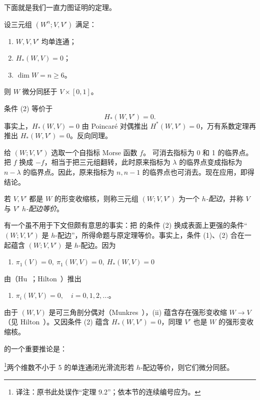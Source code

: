 
下面就是我们一直力图证明的定理。

设三元组 $(W^n;V,V')$ 满足：
\begin{enumerate}[label=(\arabic*)]
  \item $W,V,V'$ 均单连通；
  \item $H_*(W,V)=0$；
  \item $\dim W=n\geq6$。
\end{enumerate}
则 $W$ 微分同胚于 $V\times[0,1]$。

\Remark 条件 (2) 等价于
\[
  H_*(W,V')=0.
\]
事实上，$H_*(W,V)=0$ 由 Poincaré 对偶推出 $H^*(W,V')=0$，万有系数定理再推出 $H_*(W,V')=0$。反向同理。

\Proof 给 $(W;V,V')$ 选取一个自指标 Morse 函数 $f$。 可消去指标为 0 和 1 的临界点。把 $f$ 换成 $-f$，相当于把三元组翻转，此时原来指标为 $\lambda$ 的临界点变成指标为 $n-\lambda$ 的临界点。因此，原来指标为 $n,n-1$ 的临界点也可消去。现在应用，即得结论。
\EndProof

若 $V,V'$ 都是 $W$ 的形变收缩核，则称三元组 $(W;V,V')$ 为一个 \emph{$h$-配边}，并称 $V$ 与 $V'$ \emph{$h$-配边等价}。

\Remark 有一个虽不用于下文但颇有意思的事实：把 的条件 (2) 换成表面上更强的条件“$(W;V,V')$ 是 $h$-配边”，所得命题与原定理等价。事实上，条件 (1)、(2) 合在一起蕴含 $(W;V,V')$ 是 $h$-配边。因为
\begin{enumerate}[label=(\roman*)]
  \item $\pi_1(V)=0,\ \pi_1(W,V)=0,\ H_*(W,V)=0$
\end{enumerate}
由（Hu~\cite[p.~166]{ref20}；Hilton~\cite[p.~103]{ref21}）推出
\begin{enumerate}[label=(\roman*),start=2]
  \item $\pi_i(W,V)=0,\quad i=0,1,2,\ldots$。
\end{enumerate}
由于 $(W,V)$ 是可三角剖分偶对（Munkres~\cite[p.~101]{ref05}），(ii) 蕴含存在强形变收缩 $W\to V$（见 Hilton~\cite[p.~98, Theorem~1.7]{ref21}）。又因条件 (2) 蕴含 $H_*(W,V')=0$，同理 $V'$ 也是 $W$ 的强形变收缩核。

 的一个重要推论是：

\footnote{译注：原书此处误作“定理 9.2”；依本节的连续编号应为。}两个维数不小于 5 的单连通闭光滑流形若 $h$-配边等价，则它们微分同胚。

